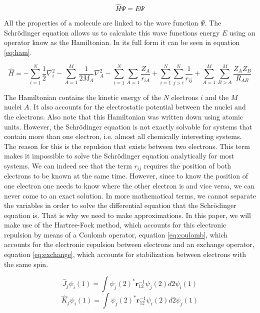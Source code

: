 \documentclass[twoside,twocolumn,9pt]{article}
\begin{document}
\begin{equation}\label{eq:erwin}
  \hat{H}\Psi = E\Psi
\end{equation}

All the properties of a molecule are linked to the wave function $\Psi$. The Schrödinger equation allows us to calculate this wave functions energy $E$ using an operator
know as the Hamiltonian. In its full form it can be seen in equation \eqref{eq:ham}\cite{Szabo1996}.

\begin{equation}\label{eq:ham}
  \hat{H} = -\sum_{i=1}^N\frac{1}{2}\nabla^2_i - \sum_{A=1}^M \frac{1}{2M_A}\nabla^2_A - \sum_{i=1}^N\sum_{A=1}\frac{Z_A}{r_{iA}} + \sum_{i=1}^N\sum_{j>i}^N\frac{1}{r_{ij}} +
  \sum_{A=1}^M\sum_{B>A}^M\frac{Z_A Z_B}{R_{AB}}
\end{equation}

The Hamiltonian contains the kinetic energy of the $N$ electrons $i$ and the $M$ nuclei $A$. It also accounts for the electrostatic potential between the nuclei and the electrons.
Also note that this Hamiltonian was written down using atomic units. However, the Schrödinger equation is not exactly solvable for systems that contain more than one electron, i.e.
almost all chemically interesting systems. The reason for this is the repulsion that exists between two electrons. This term makes it impossible to solve the Schrödinger equation
analytically for most systems. We can indeed see that the term $r_{ij}$ requires the position of both electrons to be known at the same time. However, since to know the position of
one electron one needs to know where the other electron is and vice versa, we can never come to an exact solution. In more mathematical terms, we cannot separate the variables
in order to solve the differential equation that the Schrödinger equation is. That is why we need to make approximations. In this paper, we will make use of the Hartree-Fock method,
which accounts for this electronic repulsion by means of a Coulomb operator, equation \eqref{eq:coulomb}, which accounts for the electronic repulsion between electrons and an exchange
operator, equation \eqref{eq:exchange}, which accounts for stabilization between electrons with the same spin.

\begin{equation}\label{eq:coulomb}
  \hat{J}_j\psi_i(1) = \int\psi_j(2)^*\boldsymbol{r}_{12}^{-1}\psi_j(2)d2 \psi_i(1)
\end{equation}
\begin{equation}\label{eq:exchange}
  \hat{K}_j\psi_i(1) = \int\psi_j(2)^*\boldsymbol{r}_{12}^{-1}\psi_i(2)d2 \psi_j(1)
\end{equation}
\end{document}
